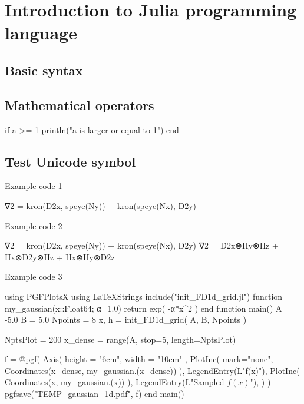 \chapter{Introduction to Julia programming language}


\section{Basic syntax}


\section{Mathematical operators}

\begin{juliacode}
if a >= 1
  println("a is larger or equal to 1")
end
\end{juliacode}


\section{Test Unicode symbol}


Example code 1
\begin{juliacode}
∇2 = kron(D2x, speye(Ny)) + kron(speye(Nx), D2y)
\end{juliacode}

Example code 2
\begin{juliacode}
∇2 = kron(D2x, speye(Ny)) + kron(speye(Nx), D2y)
∇2 = D2x⊗IIy⊗IIz + IIx⊗D2y⊗IIz + IIx⊗IIy⊗D2z 
\end{juliacode}

Example code 3
\begin{juliacode}
using PGFPlotsX
using LaTeXStrings
include("init_FD1d_grid.jl")
function my_gaussian(x::Float64; α=1.0)
  return exp( -α*x^2 )
end
function main()
  A = -5.0
  B =  5.0
  Npoints = 8
  x, h = init_FD1d_grid( A, B, Npoints )

  NptsPlot = 200
  x_dense = range(A, stop=5, length=NptsPlot)

  f = @pgf(
    Axis( {height = "6cm", width = "10cm" },
      PlotInc( {mark="none"}, Coordinates(x_dense, my_gaussian.(x_dense)) ),
      LegendEntry(L"f(x)"),
      PlotInc( Coordinates(x, my_gaussian.(x)) ),
      LegendEntry(L"Sampled $f(x)$"),
    )
  )
  pgfsave("TEMP_gaussian_1d.pdf", f)
end
main()
\end{juliacode}
